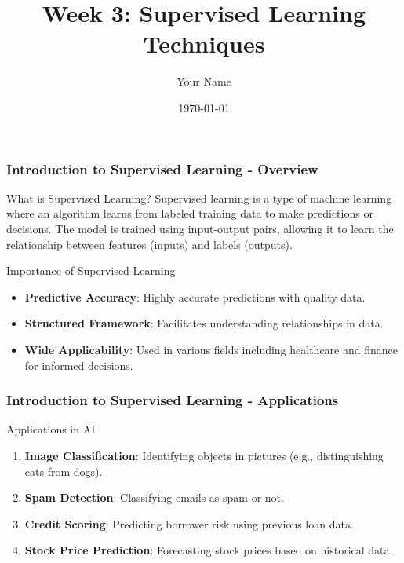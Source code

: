 \documentclass[aspectratio=169]{beamer}
\title[Supervised Learning Techniques]{Week 3: Supervised Learning Techniques}
\author[]{Your Name}
\institute[Your Institution]{
  Your Department\\
  Your Institution\\
  \vspace{0.3cm}
  Email: your.email@institution.edu
}
\date{\today}
\begin{document}
\frame{\titlepage}

\begin{frame}[fragile]
    \titlepage
\end{frame}

\begin{frame}[fragile]
    \frametitle{Introduction to Supervised Learning - Overview}
    \begin{block}{What is Supervised Learning?}
        Supervised learning is a type of machine learning where an algorithm learns from labeled training data to make predictions or decisions. The model is trained using input-output pairs, allowing it to learn the relationship between features (inputs) and labels (outputs).
    \end{block}

    \begin{block}{Importance of Supervised Learning}
        \begin{itemize}
            \item \textbf{Predictive Accuracy}: Highly accurate predictions with quality data.
            \item \textbf{Structured Framework}: Facilitates understanding relationships in data.
            \item \textbf{Wide Applicability}: Used in various fields including healthcare and finance for informed decisions.
        \end{itemize}
    \end{block}
\end{frame}

\begin{frame}[fragile]
    \frametitle{Introduction to Supervised Learning - Applications}
    \begin{block}{Applications in AI}
        \begin{enumerate}
            \item \textbf{Image Classification}: Identifying objects in pictures (e.g., distinguishing cats from dogs).
            \item \textbf{Spam Detection}: Classifying emails as spam or not.
            \item \textbf{Credit Scoring}: Predicting borrower risk using previous loan data.
            \item \textbf{Stock Price Prediction}: Forecasting stock prices based on historical data.
        \end{enumerate}
    \end{block}
\end{frame}
\end{document}
